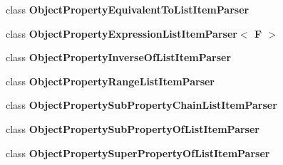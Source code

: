 \begin{DoxyCompactItemize}
\item 
class {\bfseries Object\-Property\-Equivalent\-To\-List\-Item\-Parser}
\item 
class {\bfseries Object\-Property\-Expression\-List\-Item\-Parser$<$ F $>$}
\item 
class {\bfseries Object\-Property\-Inverse\-Of\-List\-Item\-Parser}
\item 
class {\bfseries Object\-Property\-Range\-List\-Item\-Parser}
\item 
class {\bfseries Object\-Property\-Sub\-Property\-Chain\-List\-Item\-Parser}
\item 
class {\bfseries Object\-Property\-Sub\-Property\-Of\-List\-Item\-Parser}
\item 
class {\bfseries Object\-Property\-Super\-Property\-Of\-List\-Item\-Parser}
\end{DoxyCompactItemize}
